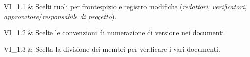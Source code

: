 VI\_1.1 & Scelti ruoli per frontespizio e registro modifiche (\textit{redattori}, \textit{verificatori}, \textit{approvatore}/\textit{responsabile di progetto}).

\tabularnewline 
VI\_1.2 & Scelte le convenzioni di numerazione di versione nei documenti.

\tabularnewline 
VI\_1.3 & Scelta la divisione dei membri per verificare i vari documenti.

	
	
